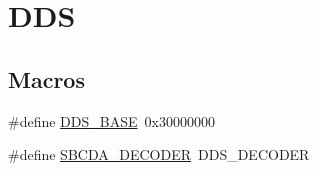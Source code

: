 \hypertarget{group___d_d_s}{}\section{D\+DS}
\label{group___d_d_s}
\subsection*{Macros}
\begin{DoxyCompactItemize}
\item 
\#define \hyperlink{group___d_d_s_gaae9812f46efd3711214d66ec5bd90674}{D\+D\+S\+\_\+\+B\+A\+SE}~0x30000000
\item 
\#define \hyperlink{group___d_d_s_ga61f7ba6d9616f3c1b1dd1ac799428fd1}{S\+B\+C\+D\+A\+\_\+\+D\+E\+C\+O\+D\+ER}~D\+D\+S\+\_\+\+D\+E\+C\+O\+D\+ER
\end{DoxyCompactItemize}
